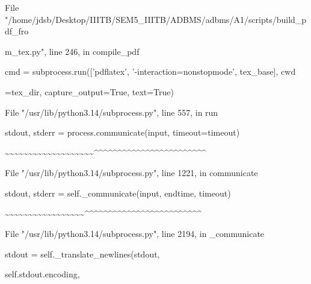 \documentclass[11pt,a4paper]{article}
\begin{document}
{File "/home/jdsb/Desktop/IIITB/SEM5\_IIITB/ADBMS/adbms/A1/scripts/build\_pdf\_fro

m\_tex.py", line 246, in compile\_pdf

cmd = subprocess.run(['pdflatex', '-interaction=nonstopmode', tex\_base], cwd

=tex\_dir, capture\_output=True, text=True)

File "/usr/lib/python3.14/subprocess.py", line 557, in run

stdout, stderr = process.communicate(input, timeout=timeout)

\textasciitilde{}\textasciitilde{}\textasciitilde{}\textasciitilde{}\textasciitilde{}\textasciitilde{}\textasciitilde{}\textasciitilde{}\textasciitilde{}\textasciitilde{}\textasciitilde{}\textasciitilde{}\textasciitilde{}\textasciitilde{}\textasciitilde{}\textasciitilde{}\textasciitilde{}\textasciitilde{}\textasciitilde{}\textasciicircum{}\textasciicircum{}\textasciicircum{}\textasciicircum{}\textasciicircum{}\textasciicircum{}\textasciicircum{}\textasciicircum{}\textasciicircum{}\textasciicircum{}\textasciicircum{}\textasciicircum{}\textasciicircum{}\textasciicircum{}\textasciicircum{}\textasciicircum{}\textasciicircum{}\textasciicircum{}\textasciicircum{}\textasciicircum{}\textasciicircum{}\textasciicircum{}\textasciicircum{}\textasciicircum{}

File "/usr/lib/python3.14/subprocess.py", line 1221, in communicate

stdout, stderr = self.\_communicate(input, endtime, timeout)

\textasciitilde{}\textasciitilde{}\textasciitilde{}\textasciitilde{}\textasciitilde{}\textasciitilde{}\textasciitilde{}\textasciitilde{}\textasciitilde{}\textasciitilde{}\textasciitilde{}\textasciitilde{}\textasciitilde{}\textasciitilde{}\textasciitilde{}\textasciitilde{}\textasciitilde{}\textasciicircum{}\textasciicircum{}\textasciicircum{}\textasciicircum{}\textasciicircum{}\textasciicircum{}\textasciicircum{}\textasciicircum{}\textasciicircum{}\textasciicircum{}\textasciicircum{}\textasciicircum{}\textasciicircum{}\textasciicircum{}\textasciicircum{}\textasciicircum{}\textasciicircum{}\textasciicircum{}\textasciicircum{}\textasciicircum{}\textasciicircum{}\textasciicircum{}\textasciicircum{}\textasciicircum{}\textasciicircum{}

File "/usr/lib/python3.14/subprocess.py", line 2194, in \_communicate

stdout = self.\_translate\_newlines(stdout,

self.stdout.encoding,

}
\end{document}
